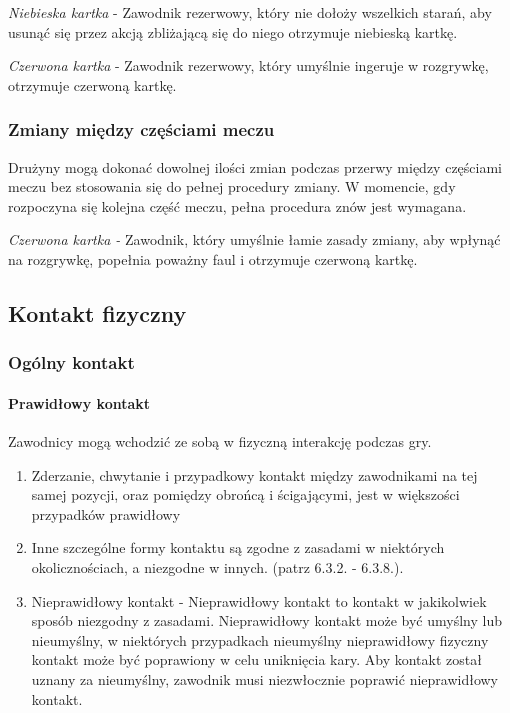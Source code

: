\documentclass[12pt]{article}
\begin{document}
\emph{Niebieska kartka} - Zawodnik rezerwowy, który nie dołoży wszelkich
starań, aby usunąć się przez akcją zbliżającą się do niego otrzymuje
niebieską kartkę.

\emph{Czerwona kartka} - Zawodnik rezerwowy, który umyślnie ingeruje w
rozgrywkę, otrzymuje czerwoną kartkę.

\subsubsection{Zmiany między częściami meczu}

Drużyny mogą dokonać dowolnej ilości zmian podczas przerwy między
częściami meczu bez stosowania się do pełnej procedury zmiany. W
momencie, gdy rozpoczyna się kolejna część meczu, pełna procedura znów
jest wymagana.

\emph{Czerwona kartka -} Zawodnik, który umyślnie łamie zasady zmiany,
aby wpłynąć na rozgrywkę, popełnia poważny faul i otrzymuje czerwoną
kartkę.

\subsection{Kontakt fizyczny}

\subsubsection{Ogólny kontakt}

\paragraph{Prawidłowy kontakt}
Zawodnicy mogą wchodzić
ze sobą w fizyczną interakcję podczas gry.

\begin{enumerate}
\item
  Zderzanie, chwytanie i przypadkowy kontakt między zawodnikami na tej
  samej pozycji, oraz pomiędzy obrońcą i ścigającymi, jest w większości
  przypadków prawidłowy
\item
  Inne szczególne formy kontaktu są zgodne z zasadami w niektórych
  okolicznościach, a niezgodne w innych. (patrz 6.3.2. - 6.3.8.).
\item
  Nieprawidłowy kontakt - Nieprawidłowy kontakt to kontakt w jakikolwiek
  sposób niezgodny z zasadami. Nieprawidłowy kontakt może być umyślny
  lub nieumyślny, w niektórych przypadkach nieumyślny nieprawidłowy
  fizyczny kontakt może być poprawiony w celu uniknięcia kary. Aby
  kontakt został uznany za nieumyślny, zawodnik musi niezwłocznie
  poprawić nieprawidłowy kontakt.
\end{enumerate}
\end{document}
